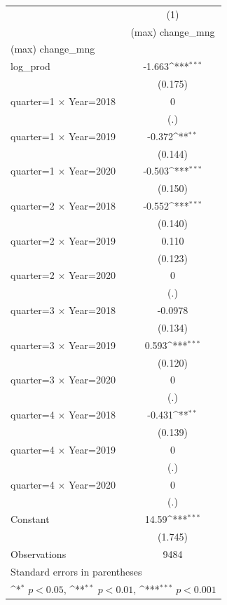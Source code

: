 {
\def\sym#1{\ifmmode^{#1}\else\(^{#1}\)\fi}
\begin{tabular}{l*{1}{c}}
\hline\hline
                    &\multicolumn{1}{c}{(1)}\\
                    &\multicolumn{1}{c}{(max) change\_mng}\\
\hline
(max) change\_mng    &                     \\
log\_prod            &      -1.663\sym{***}\\
                    &     (0.175)         \\
[1em]
quarter=1 $\times$ Year=2018&           0         \\
                    &         (.)         \\
[1em]
quarter=1 $\times$ Year=2019&      -0.372\sym{**} \\
                    &     (0.144)         \\
[1em]
quarter=1 $\times$ Year=2020&      -0.503\sym{***}\\
                    &     (0.150)         \\
[1em]
quarter=2 $\times$ Year=2018&      -0.552\sym{***}\\
                    &     (0.140)         \\
[1em]
quarter=2 $\times$ Year=2019&       0.110         \\
                    &     (0.123)         \\
[1em]
quarter=2 $\times$ Year=2020&           0         \\
                    &         (.)         \\
[1em]
quarter=3 $\times$ Year=2018&     -0.0978         \\
                    &     (0.134)         \\
[1em]
quarter=3 $\times$ Year=2019&       0.593\sym{***}\\
                    &     (0.120)         \\
[1em]
quarter=3 $\times$ Year=2020&           0         \\
                    &         (.)         \\
[1em]
quarter=4 $\times$ Year=2018&      -0.431\sym{**} \\
                    &     (0.139)         \\
[1em]
quarter=4 $\times$ Year=2019&           0         \\
                    &         (.)         \\
[1em]
quarter=4 $\times$ Year=2020&           0         \\
                    &         (.)         \\
[1em]
Constant            &       14.59\sym{***}\\
                    &     (1.745)         \\
\hline
Observations        &        9484         \\
\hline\hline
\multicolumn{2}{l}{\footnotesize Standard errors in parentheses}\\
\multicolumn{2}{l}{\footnotesize \sym{*} \(p<0.05\), \sym{**} \(p<0.01\), \sym{***} \(p<0.001\)}\\
\end{tabular}
}
